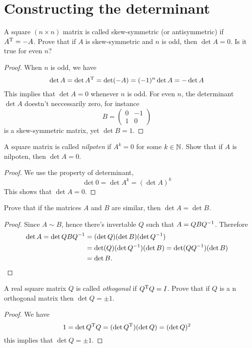 \documentclass{article}
\begin{document}
\section{Constructing the determinant}
\setcounter{exercise}{3}
\begin{exercise}
  A square $(n\times n)$ matrix is called skew-symmetric 
  (or antisymmetric) if $A^\mathrm{T} = -A$. Prove that if $A$ is 
  skew-symmetric and $n$ is odd, then $\det A=0$. Is it
  true for even $n$?
\end{exercise}
\begin{proof}
  When $n$ is odd, we have
  \begin{align*}
    \det A=\det A^\mathrm{T}=\det (-A)=(-1)^n\det A=-\det A
  \end{align*}
  This implies that $\det A=0$ whenever $n$ is odd. For even $n$,
  the determinant $\det A$ doestn't neccessarily zero, for instance
  \[ B=\begin{pmatrix} 0&-1\\1&0 \end{pmatrix} \]
  is a skew-symmetric matrix, yet $\det B=1$.
\end{proof}
\begin{exercise}
  A square matrix is called \emph{nilpoten} if $A^k=0$
  for some $k\in\N$. Show that if $A$ is nilpoten, then
  $\det A=0$.
\end{exercise}
\begin{proof}
  We use the property of determinant,
  \[ \det 0=\det A^k=(\det A)^k \]
  This shows that $\det A=0$.
\end{proof}
\begin{exercise}
  Prove that if the matrices $A$ and $B$ are similar,
  then $\det A=\det B$.
\end{exercise}
\begin{proof}
  Since $A\sim B$, hence there's invertable $Q$ such that
  $A=QBQ^{-1}$. Therefore
  \begin{align*}
    \det A=\det QBQ^{-1}
    &=(\det Q)(\det B)(\det Q^{-1})\\
    &=\det(Q)(\det Q^{-1})(\det B)=\det(QQ^{-1})(\det B)\\
    &=\det B.
  \end{align*}
\end{proof}
\begin{exercise}
  A real square matrix $Q$ is called \emph{othogonal} if 
  $Q^\mathrm{T} Q=I$. Prove that if $Q$ is a n orthogonal matrix
  then $\det Q=\pm 1$.
\end{exercise}
\begin{proof}
  We have
  \[ 1=\det Q^\mathrm{T} Q=(\det Q^\mathrm{T})(\det Q)=(\det Q)^2 \]
  this implies that $\det Q=\pm 1.$
\end{proof}
\end{document}
